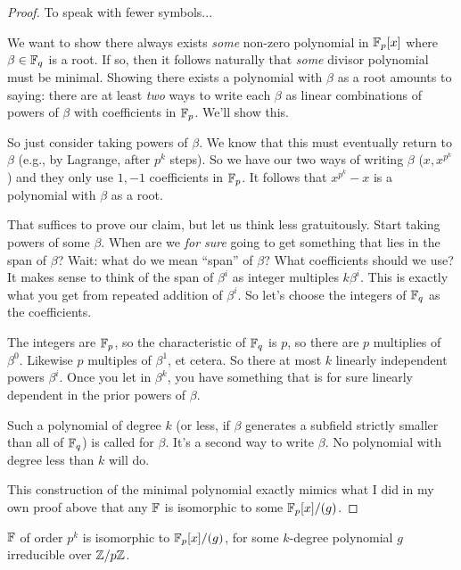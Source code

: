\begin{proof}
  To speak with fewer symbols...

  We want to show there always exists \emph{some} non-zero polynomial in
  $\mathbb{F}_p[x]$ where $\beta\in\mathbb{F}_q$ is a root. If so, then it follows
  naturally that \emph{some} divisor polynomial must be minimal. Showing
  there exists a polynomial with $\beta$ as a root amounts to saying:
  there are at least \emph{two} ways to write each $\beta$ as linear
  combinations of powers of $\beta$ with coefficients in $\mathbb{F}_p$. We'll
  show this.

  So just consider taking powers of $\beta$. We know that this must
  eventually return to $\beta$ (e.g., by Lagrange, after $p^k$ steps).
  So we have our two ways of writing $\beta$ ($x, x^{p^k}$) and they
  only use $1, -1$ coefficients in $\mathbb{F}_p$. It follows that $x^{p^k} - x$
  is a polynomial with $\beta$ as a root.

  That suffices to prove our claim, but let us think less gratuitously.
  Start taking powers of some $\beta$. When are we \emph{for sure} going
  to get something that lies in the span of $\beta$? Wait: what do we
  mean ``span'' of $\beta$? What coefficients should we use? It makes
  sense to think of the span of $\beta^i$ as integer multiples
  $k\beta^i$. This is exactly what you get from repeated addition of
  $\beta^i$. So let's choose the integers of $\mathbb{F}_q$ as the coefficients.

  The integers are $\mathbb{F}_p$, so the characteristic of $\mathbb{F}_q$ is $p$, so
  there are $p$ multiplies of $\beta^0$. Likewise $p$ multiples of
  $\beta^1$, et cetera. So there at most $k$ linearly independent powers
  $\beta^i$. Once you let in $\beta^k$, you have something that is for
  sure linearly dependent in the prior powers of $\beta$.

  Such a polynomial of degree $k$ (or less, if $\beta$ generates a
  subfield strictly smaller than all of $\mathbb{F}_q$) is called
   for $\beta$. It's a second way to write $\beta$. No
  polynomial with degree less than $k$ will do.

  This construction of the minimal polynomial exactly mimics what I did
  in my own proof above that any $\mathbb{F}$ is isomorphic to some $\mathbb{F}_p[x]/(g)$.
\end{proof}

\begin{theorem}
  $\mathbb{F}$ of order $p^k$ is isomorphic to $\mathbb{F}_p[x]/(g)$, for some $k$-degree
  polynomial $g$ irreducible over $\mathbb{Z} / p\mathbb{Z}$.
\end{theorem}

